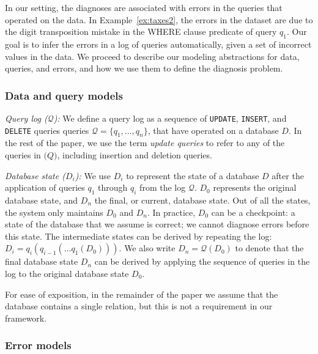 In our setting, the diagnoses are associated with errors in the queries that
operated on the data. In Example~\ref{ex:taxes2}, the errors in the dataset
are due to the digit transposition mistake in the WHERE clause predicate of
query $q_1$. Our goal is to infer the errors in a log of queries
automatically, given a set of incorrect values in the data. We proceed to
describe our modeling abstractions for data, queries, and errors, and how we
use them to define the diagnosis problem.

\subsubsection*{Data and query models}

\noindent
\emph{Query log ($\mathcal{Q}$):}
We define a query log as a sequence of \texttt{UPDATE}, \texttt{INSERT}, and
\texttt{DELETE} queries queries $\mathcal{Q}=\{q_1,\dots,q_n\}$, that have
operated on a database $D$. In the rest of the paper, we use the term
\emph{update queries} to refer to any of the queries in $\mathcal(Q)$,
including insertion and deletion queries.

\smallskip
\noindent
\emph{Database state ($D_i$):}
We use $D_i$ to represent the state of a database $D$ after the application of
queries $q_1$ through $q_i$ from the log $\mathcal{Q}$. $D_0$ represents the
original database state, and $D_n$ the final, or current, database state. Out
of all the states, the system only maintains $D_0$ and $D_n$. In practice,
$D_0$ can be a checkpoint: a state of the database that we assume is correct;
we cannot diagnose errors before this state. The intermediate states can be
derived by repeating the log: $D_i=q_i(q_{i-1}(\dots q_1(D_0)))$. We also
write $D_n=\mathcal{Q}(D_0)$ to denote that the final database state $D_n$ can
be derived by applying the sequence of queries in the log to the original
database state $D_0$.

For ease of
exposition, in the remainder of the paper we assume that the database contains
a single relation, but this is not a requirement in our framework.


\subsubsection*{Error models}

